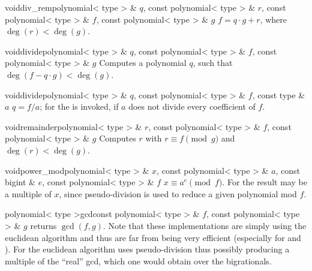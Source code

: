 \begin{fcode}{void}{div_rem}{polynomial< type > & $q$, const polynomial< type > & $r$,
    const polynomial< type > & $f$, const polynomial< type > & $g$}%
  $f = q \cdot g + r$, where $\deg(r) < \deg(g)$.
\end{fcode}

\begin{fcode}{void}{divide}{polynomial< type > & $q$, const polynomial< type > & $f$, const polynomial< type > & $g$}
  Computes a polynomial $q$, such that $\deg(f - q \cdot g) < \deg(g)$.
\end{fcode}

\begin{fcode}{void}{divide}{polynomial< type > & $q$, const polynomial< type > & $f$, const type & $a$}
  $q = f / a$; for  the \LEH is invoked, if $a$ does not divide every
  coefficient of $f$.
\end{fcode}

\begin{fcode}{void}{remainder}{polynomial< type > & $r$, const polynomial< type > & $f$,
    const polynomial< type > & $g$}%
  Computes $r$ with $r \equiv f \pmod{g}$ and $\deg(r) < \deg(g)$.
\end{fcode}

\begin{fcode}{void}{power_mod}{polynomial< type > & $x$, const polynomial< type > & $a$,
    const bigint & $e$, const polynomial< type > & $f$}%
  $x \equiv a^e \pmod{f}$.  For  the result may be a multiple of $x$,
  since pseudo-division is used to reduce a given polynomial mod $f$.
\end{fcode}




\begin{fcode}{polynomial< type >}{gcd}{const polynomial< type > & $f$, const polynomial< type > & $g$}
  returns $\gcd(f, g)$.  Note that these implementations are simply using the euclidean
  algorithm and thus are far from being very efficient (especially for  and ).  For  the euclidean
  algorithm uses pseudo-division thus possibly producing a multiple of the ``real'' gcd, which
  one would obtain over the bigrationals.
\end{fcode}

